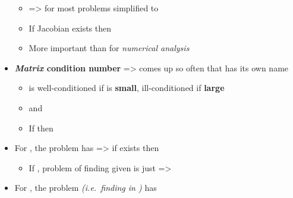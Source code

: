 \begin{itemize}
  \begin{itemize}
  
  \item
    =\textgreater{} for most problems simplified to
  \item
    If Jacobian  exists then
  \item
    More important than \iMbox{\hat{\kappa}} for \emph{numerical
    analysis}
  \end{itemize}
\item
  \textbf{\emph{Matrix} condition number}
  =\textgreater{} comes up so often that has its own name

  \begin{itemize}
  
  \item
     is well-conditioned if
     is \textbf{small}, ill-conditioned if
    \textbf{large}
  \item
     and
  \item
    If  then
  \end{itemize}
\item
  For , the problem
   has
   =\textgreater{} if
   exists then 

  \begin{itemize}
  
  \item
    If , problem of finding  given  is
    just  =\textgreater{}
  \end{itemize}
\item
  For , the problem
   \emph{(i.e.~finding
   in )} has
\end{itemize}

